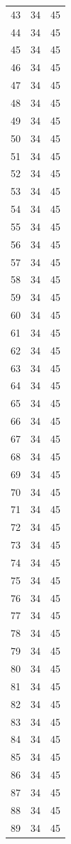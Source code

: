 \begin{table}
\begin{tabular}{rrr}
43 & 34 & 45 \\
44 & 34 & 45 \\
45 & 34 & 45 \\
46 & 34 & 45 \\
47 & 34 & 45 \\
48 & 34 & 45 \\
49 & 34 & 45 \\
50 & 34 & 45 \\
51 & 34 & 45 \\
52 & 34 & 45 \\
53 & 34 & 45 \\
54 & 34 & 45 \\
55 & 34 & 45 \\
56 & 34 & 45 \\
57 & 34 & 45 \\
58 & 34 & 45 \\
59 & 34 & 45 \\
60 & 34 & 45 \\
61 & 34 & 45 \\
62 & 34 & 45 \\
63 & 34 & 45 \\
64 & 34 & 45 \\
65 & 34 & 45 \\
66 & 34 & 45 \\
67 & 34 & 45 \\
68 & 34 & 45 \\
69 & 34 & 45 \\
70 & 34 & 45 \\
71 & 34 & 45 \\
72 & 34 & 45 \\
73 & 34 & 45 \\
74 & 34 & 45 \\
75 & 34 & 45 \\
76 & 34 & 45 \\
77 & 34 & 45 \\
78 & 34 & 45 \\
79 & 34 & 45 \\
80 & 34 & 45 \\
81 & 34 & 45 \\
82 & 34 & 45 \\
83 & 34 & 45 \\
84 & 34 & 45 \\
85 & 34 & 45 \\
86 & 34 & 45 \\
87 & 34 & 45 \\
88 & 34 & 45 \\
89 & 34 & 45 \\

\end{tabular}
\end{table}
